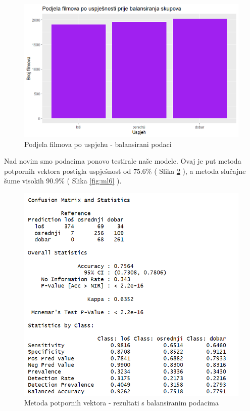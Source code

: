 \begin{figure}[H]
	\centering
	\includegraphics[width=15cm]{../figures/expl/004.png}
	\caption{Podjela filmova po uspjehu - balansirani podaci}
	\label{fig:ml4}
\end{figure}

Nad novim smo podacima ponovo testirale naše modele. Ovaj je put metoda potpornih vektora postigla uspješnost od 75.6\% ( Slika \ref{fig:ml5} ), a metoda slučajne šume visokih 90.9\%  ( Slika \ref{fig:ml6} ).

\begin{figure}[H]
	\centering
	\includegraphics[width=15cm]{../figures/expl/005.png}
	\caption{Metoda potpornih vektora - rezultati s balansiranim podacima}
	\label{fig:ml5}
\end{figure}

